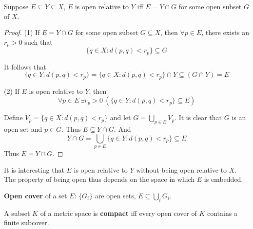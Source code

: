     \begin{theo}
        Suppose $E \subseteq Y \subseteq X$, $E$ is open relative to $Y$ iff $E = Y \cap G$ for some open subset $G$ of $X$.
    \end{theo}
    \begin{framed}
    \begin{proof}

        (1) If $E = Y \cap G$ for some open subset $G \subseteq X$, then $\forall p \in E$, there exists an $r_p > 0$ such that 
        \begin{equation}
            \{q \in X : d(p, q) < r_p\} \subseteq G
        \end{equation}
        
        It follows that
        \begin{equation}
            \{q \in Y : d(p, q) < r_p\} = \{q \in X : d(p, q) < r_p\} \cap Y \subseteq (G \cap Y) = E
        \end{equation}

        (2) If $E$ is open relative to $Y$, then
        \begin{equation}
            \forall p \in E \ \exists r_p > 0 \ \left( \{q \in Y : d(p, q) < r_p\} \subseteq E \right)
        \end{equation}
        
        Define $V_p = \{ q \in X : d(p, q) < r_p \}$
        and let $G = \bigcup_{p \in E} V_p$.
        It is clear that $G$ is an open set and $p \in G$. Thus $E \subseteq Y \cap G$. And
        \begin{equation}
            Y \cap G = \bigcup_{p \in E} \{ q \in Y : d(p, q) < r_p \} \subseteq E
        \end{equation}
        Thus $E = Y \cap G$.
    \end{proof}
    \end{framed}

    \begin{rem}
        It is interesting that $E$ is open relative to $Y$ without being open relative to $X$. The property of being open thus depends on the space in which $E$ is embedded. 
    \end{rem}

    \begin{defi}
        \textbf{Open cover} of a set $E$: $\{G_i\}$ are open sets, $E \subseteq \bigcup_i G_i$.
    \end{defi}

    \begin{defi}
        A subset $K$ of a metric space is \textbf{compact} iff every open cover of $K$ contains a finite subcover.
    \end{defi}

